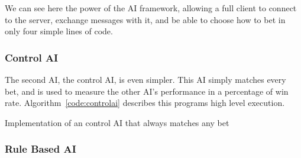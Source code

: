 We can see here the power of the AI framework, allowing a full client to connect
to the server, exchange messages with it, and be able to choose how to bet
in only four simple lines of code.

\subsubsection{Control AI}\label{section:controlai}

The second AI, the control AI, is even simpler. This AI simply matches every
bet, and is used to measure the other AI's performance in a percentage of
win rate. Algorithm~\ref{code:controlai} describes this programs high level
execution.

\vspace{0.3cm}

\begin{algorithm}[H]
    \BlankLine{}
     
\caption{Implementation of an control AI that always matches any bet}%
\label{code:controlai}
\end{algorithm}

\vspace{0.3cm}

\subsubsection{Rule Based AI}\label{section:rulebasedai}

